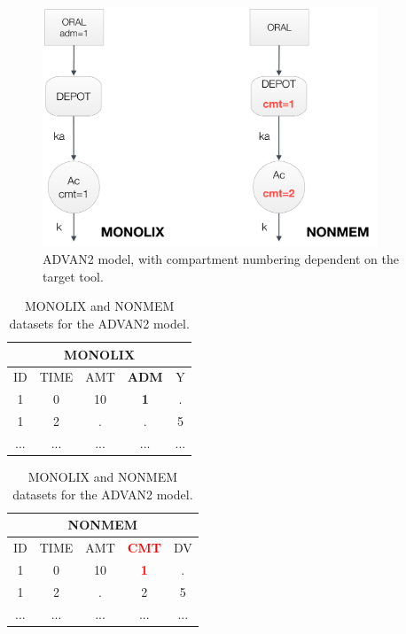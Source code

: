\begin{figure}[htbp!]
\centering
 \includegraphics[width=100mm]{pics/Advan2}
\caption{ADVAN2 model, with compartment numbering dependent on the target tool.}
\label{fig:Advan2}
\end{figure}


\begin{table}[ht!]
\footnotesize
\parbox{.5\linewidth}{
\centering
\begin{tabular}{ccccc}
  \hline
   \multicolumn{5}{c}{\textbf{MONOLIX}} \\
  \hline
ID & TIME & AMT & \textbf{ADM} & Y \\
  \hline
1  & 0        & 10   & \textbf{1} & .       \\
1  & 2        & .      & .     & 5      \\
... &  ...      &  ...   &  ...  & ...   \\
\end{tabular}
}
\hfill
\parbox{.5\linewidth}{
\centering
\begin{tabular}{ccccc}
  \hline
   \multicolumn{5}{c}{\textbf{NONMEM}} \\
  \hline
ID & TIME & AMT & \textbf{\textcolor{red}{CMT}} & DV \\
  \hline
1  & 0        & 10   & \textbf{\textcolor{red}{1}}   & .    \\
1  & 2        & .      & 2    & 5   \\
... &  ...      &  ...   &  ... & ...  \\
\end{tabular}
}
\caption{MONOLIX and NONMEM datasets for the ADVAN2 model.}
\end{table}

\lstset{language=MLXTRANcode}
\begin{lstlisting}
\end{lstlisting}


